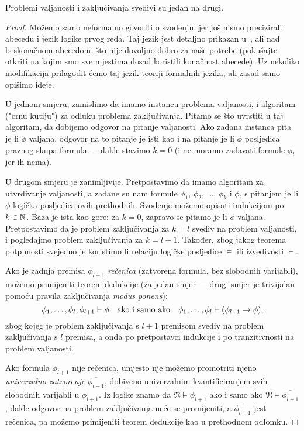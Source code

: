\begin{propozicija}[{name=[međusobna svedivost valjanosti i zaključivanja]}]\label{pp:valj<>zaklj}
Problemi valjanosti i zaključivanja svedivi su jedan na drugi.
\end{propozicija}
\begin{proof}
Možemo samo neformalno govoriti o svođenju, jer još nismo precizirali abecedu i jezik logike prvog reda. Taj jezik jest detaljno prikazan u~\cite{skr:VukML}, ali nad beskonačnom abecedom, što nije dovoljno dobro za naše potrebe (pokušajte otkriti na kojim smo sve mjestima dosad koristili konačnost abecede). Uz nekoliko modifikacija prilagodit ćemo taj jezik teoriji formalnih jezika, ali zasad samo opišimo ideje.

U jednom smjeru, zamislimo da imamo instancu problema valjanosti, i algoritam ("crnu kutiju") za odluku problema zaključivanja. Pitamo se što uvrstiti u taj algoritam, da dobijemo odgovor na pitanje valjanosti. Ako zadana instanca pita je li $\phi$ valjana, odgovor na to pitanje je isti kao i na pitanje je li $\phi$ posljedica praznog skupa formula --- dakle stavimo $k=0$ (i ne moramo zadavati formule $\phi_i$ jer ih nema).

U drugom smjeru je zanimljivije. Pretpostavimo da imamo algoritam za utvrđivanje valjanosti, a zadane su nam formule $\phi_1$, $\phi_2$,~\ldots, $\phi_k$ i $\phi$, s pitanjem je li $\phi$ logička posljedica ovih prethodnih. Svođenje možemo opisati indukcijom po $k\in{\mathbb N}$. Baza je ista kao gore: za $k=0$, zapravo se pitamo je li $\phi$ valjana. Pretpostavimo da je problem zaključivanja za $k=l$ svediv na problem valjanosti, i pogledajmo problem zaključivanja za $k=l+1$. Također, zbog jakog teorema potpunosti svejedno je koristimo li relaciju logičke posljedice $\models$ ili izvedivosti $\vdash$.

Ako je zadnja premisa $\phi_{l+1}$ \emph{rečenica} (zatvorena formula, bez slobodnih varijabli), možemo primijeniti teorem dedukcije (za jedan smjer --- drugi smjer je trivijalan pomoću pravila zaključivanja \emph{modus ponens}):
\begin{equation}\label{eq:prebaci}
\phi_1,\dotsc,\phi_l,\phi_{l+1}\vdash\phi\text{\quad ako i samo ako\quad}
\phi_1,\dotsc,\phi_l\vdash(\phi_{l+1}\to\phi)\text,
\end{equation}
zbog kojeg je problem zaključivanja s $l+1$ premisom svediv na problem zaključivanja s $l$ premisa, a onda po pretpostavci indukcije i po tranzitivnosti na problem valjanosti.

Ako formula $\phi_{l+1}$ nije rečenica, umjesto nje možemo promotriti njeno \emph{univerzalno zatvorenje} $\overline{\phi_{l+1}}$, dobiveno univerzalnim kvantificiranjem svih slobodnih varijabli u $\phi_{l+1}$. Iz logike znamo da $\mathfrak N\models\phi_{l+1}$ ako i samo ako $\mathfrak N\models\overline{\phi_{l+1}}$, dakle odgovor na problem zaključivanja neće se promijeniti, a $\overline{\phi_{l+1}}$ jest rečenica, pa možemo primijeniti teorem dedukcije kao u prethodnom odlomku.
\end{proof}
